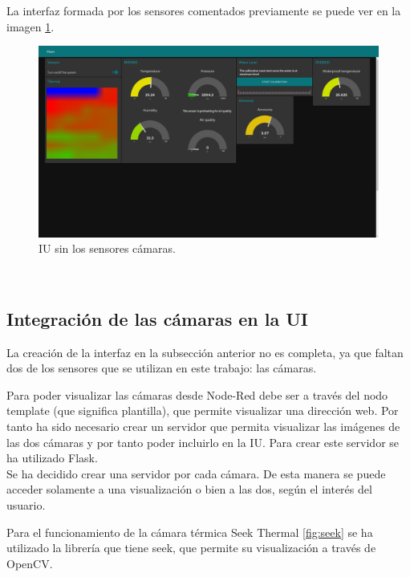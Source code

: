 La interfaz formada por los sensores comentados previamente se puede ver en la imagen \ref{fig:ui_nocams}.
\begin{figure} [h!]
  \begin{center}
    \includegraphics[width=16cm]{figs/ui_nocams}
  \end{center}
  \caption{IU sin los sensores cámaras.}
  \label{fig:ui_nocams}
\end{figure}\\

\subsection{Integración de las cámaras en la UI}
La creación de la interfaz en la subsección anterior no es completa, ya que faltan dos de los sensores que se utilizan en este trabajo: las cámaras.

Para poder visualizar las cámaras desde Node-Red debe ser a través del nodo template (que significa plantilla), que permite visualizar una dirección web. Por tanto ha sido necesario crear un servidor que permita visualizar las imágenes de las dos cámaras y por tanto poder incluirlo en la IU. Para crear este servidor se ha utilizado Flask.\\

Se ha decidido crear una servidor por cada cámara. De esta manera se puede acceder solamente a una visualización o bien a las dos, según el interés del usuario. 

Para el funcionamiento de la cámara térmica Seek Thermal \ref{fig:seek} se ha utilizado la librería que tiene seek, que permite su visualización a través de OpenCV.

